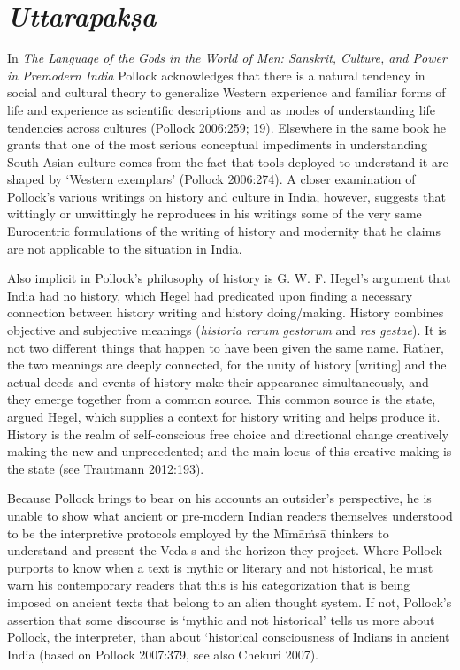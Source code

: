 \section*{\textit{Uttarapakṣa}}

In \textit{The Language of the Gods in the World of Men: Sanskrit, Culture, and Power in Premodern India} Pollock acknowledges that there is a natural tendency in social and cultural theory to generalize Western experience and familiar forms of life and experience as scientific descriptions and as modes of understanding life tendencies across cultures (Pollock 2006:259; 19). Elsewhere in the same book he grants that one of the most serious conceptual impediments in understanding South Asian culture comes from the fact that tools deployed to understand it are shaped by ‘Western exemplars’ (Pollock 2006:274). A closer examination of Pollock’s various writings on history and culture in India, however, suggests that wittingly or unwittingly he reproduces in his writings some of the very same Eurocentric formulations of the writing of history and modernity that he claims are not applicable to the situation in India.

Also implicit in Pollock’s philosophy of history is G. W. F. Hegel’s argument that India had no history, which Hegel had predicated upon finding a necessary connection between history writing and history doing/making. History combines objective and subjective meanings (\textit{historia rerum gestorum} and \textit{res gestae}). It is not two different things that happen to have been given the same name. Rather, the two meanings are deeply connected, for the unity of history [writing] and the actual deeds and events of history make their appearance simultaneously, and they emerge together from a common source. This common source is the state, argued Hegel, which supplies a context for history writing and helps produce it. History is the realm of self-conscious free choice and directional change creatively making the new and unprecedented; and the main locus of this creative making is the state (see Trautmann 2012:193).

Because Pollock brings to bear on his accounts an outsider’s perspective, he is unable to show what ancient or pre-modern Indian readers themselves understood to be the interpretive protocols employed by the Mīmāṁsā thinkers to understand and present the Veda-s and the horizon they project. Where Pollock purports to know when a text is mythic or literary and not historical, he must warn his contemporary readers that this is his categorization that is being imposed on ancient texts that belong to an alien thought system. If not, Pollock’s assertion that some discourse is ‘mythic and not historical’ tells us more about Pollock, the interpreter, than about ‘historical consciousness of Indians in ancient India (based on Pollock 2007:379, see also Chekuri 2007).

